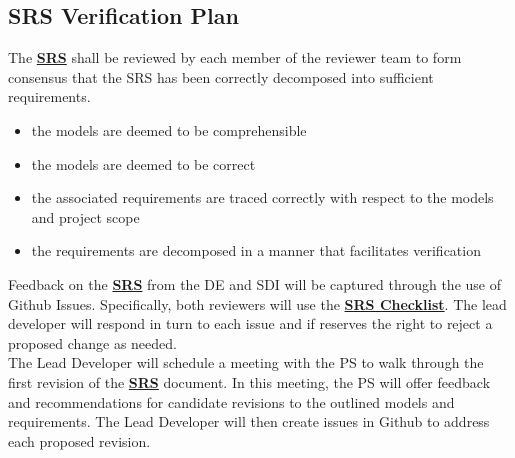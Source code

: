 \documentclass[12pt, titlepage]{article}
\begin{document}
\subsection{SRS Verification Plan}
The \textbf{\href{https://github.com/KiranSingh15/CAS-741-Image-Correspondences/blob/main/docs/SRS/SRS.pdf}
{SRS}} shall be reviewed by each member of the reviewer team to form consensus that the SRS has been correctly 
decomposed into sufficient requirements.
\begin{itemize}
\item the models are deemed to be comprehensible
\item the models are deemed to be correct
\item the associated requirements are traced correctly with respect to the models 
and project scope 
\item the requirements are decomposed in a manner that facilitates verification
\end{itemize}
Feedback on the \textbf{\href{https://github.com/KiranSingh15/CAS-741-Image-Correspondences/blob/main/docs/SRS/SRS.pdf}
{SRS}}
 from the DE and SDI will be captured through 
the use of Github Issues. Specifically, both reviewers will use the 
\textbf{\href{https://github.com/KiranSingh15/CAS-741-Image-Correspondences/blob/
main/docs/Checklists/SRS-Checklist.pdf}
{SRS Checklist}}. 
The lead developer will respond in turn to each issue and if 
reserves the right to reject a proposed change as needed. \\
The Lead Developer will schedule a meeting with the PS to walk through 
the first revision of the \textbf{\href{https://github.com/KiranSingh15/CAS-741-Image-Correspondences/blob/main/docs/SRS/SRS.pdf}
{SRS}}
 document. In this meeting, the PS will offer 
feedback and recommendations for candidate revisions to the outlined models and requirements. 
The Lead Developer will then create issues in Github to address each proposed revision.
\end{document}
